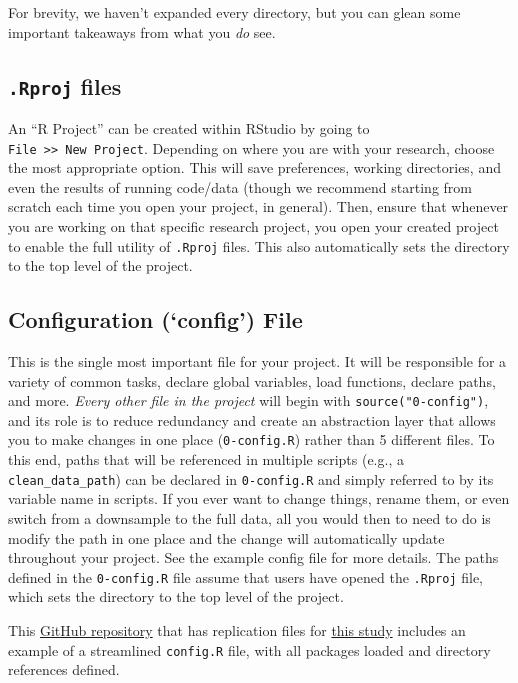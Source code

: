 \documentclass[]{book}
\begin{document}
For brevity, we haven't expanded every directory, but you can glean some important takeaways from what you \emph{do} see.

\hypertarget{rproj-files}{%
\subsection{\texorpdfstring{\texttt{.Rproj} files}{.Rproj files}}\label{rproj-files}}

An ``R Project'' can be created within RStudio by going to \texttt{File\ \textgreater{}\textgreater{}\ New\ Project}. Depending on where you are with your research, choose the most appropriate option. This will save preferences, working directories, and even the results of running code/data (though we recommend starting from scratch each time you open your project, in general). Then, ensure that whenever you are working on that specific research project, you open your created project to enable the full utility of \texttt{.Rproj} files. This also automatically sets the directory to the top level of the project.

\hypertarget{configuration-config-file}{%
\subsection{Configuration (`config') File}\label{configuration-config-file}}

This is the single most important file for your project. It will be responsible for a variety of common tasks, declare global variables, load functions, declare paths, and more. \emph{Every other file in the project} will begin with \texttt{source("0-config")}, and its role is to reduce redundancy and create an abstraction layer that allows you to make changes in one place (\texttt{0-config.R}) rather than 5 different files. To this end, paths that will be referenced in multiple scripts (e.g., a \texttt{clean\_data\_path}) can be declared in \texttt{0-config.R} and simply referred to by its variable name in scripts. If you ever want to change things, rename them, or even switch from a downsample to the full data, all you would then to need to do is modify the path in one place and the change will automatically update throughout your project. See the example config file for more details. The paths defined in the \texttt{0-config.R} file assume that users have opened the \texttt{.Rproj} file, which sets the directory to the top level of the project.

This \href{https://github.com/jadebc-berkeley/WBB-STH-Kato-Katz}{GitHub repository} that has replication files for \href{https://www.biorxiv.org/content/10.1101/629501v1}{this study} includes an example of a streamlined \texttt{config.R} file, with all packages loaded and directory references defined.
\end{document}
